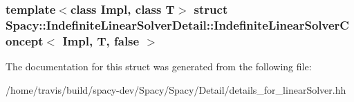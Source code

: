 \subsubsection*{template$<$class Impl, class T$>$ struct Spacy\-::\-Indefinite\-Linear\-Solver\-Detail\-::\-Indefinite\-Linear\-Solver\-Concept$<$ Impl, T, false $>$}



\-The documentation for this struct was generated from the following file\-:\begin{DoxyCompactItemize}
\item 
/home/travis/build/spacy-\/dev/\-Spacy/\-Spacy/\-Detail/details\-\_\-for\-\_\-linear\-Solver.\-hh\end{DoxyCompactItemize}
